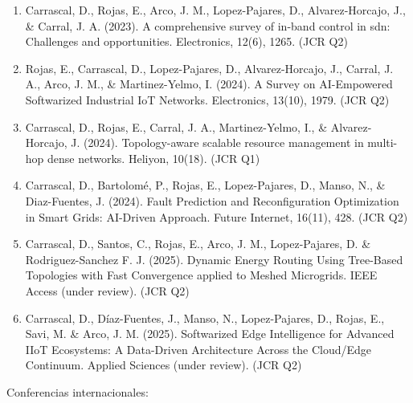 \begin{enumerate}
    \item Carrascal, D., Rojas, E., Arco, J. M., Lopez-Pajares, D., Alvarez-Horcajo, J., \& Carral, J. A. (2023). A comprehensive survey of in-band control in sdn: Challenges and opportunities. Electronics, 12(6), 1265. (JCR Q2)
    
    \item Rojas, E., Carrascal, D., Lopez-Pajares, D., Alvarez-Horcajo, J., Carral, J. A., Arco, J. M., \& Martinez-Yelmo, I. (2024). A Survey on AI-Empowered Softwarized Industrial IoT Networks. Electronics, 13(10), 1979. (JCR Q2)
    
    \item Carrascal, D., Rojas, E., Carral, J. A., Martinez-Yelmo, I., \& Alvarez-Horcajo, J. (2024). Topology-aware scalable resource management in multi-hop dense networks. Heliyon, 10(18). (JCR Q1)
    
    \item Carrascal, D., Bartolomé, P., Rojas, E., Lopez-Pajares, D., Manso, N., \& Diaz-Fuentes, J. (2024). Fault Prediction and Reconfiguration Optimization in Smart Grids: AI-Driven Approach. Future Internet, 16(11), 428. (JCR Q2)
    
    \item Carrascal, D., Santos, C., Rojas, E., Arco, J. M., Lopez-Pajares, D. \& Rodriguez-Sanchez F. J. (2025). Dynamic Energy Routing Using Tree-Based Topologies with Fast Convergence applied to Meshed Microgrids. IEEE Access (under review). (JCR Q2)

    \item Carrascal, D., Díaz-Fuentes, J., Manso, N., Lopez-Pajares, D., Rojas, E., Savi, M. \& Arco, J. M. (2025). Softwarized Edge Intelligence for Advanced IIoT Ecosystems: A Data-Driven Architecture Across the Cloud/Edge Continuum. Applied Sciences (under review). (JCR Q2)
  
\end{enumerate}

Conferencias internacionales:

